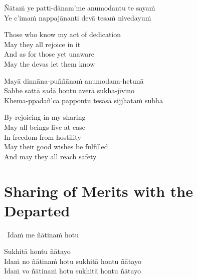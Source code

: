 Ñātaṁ ye patti-dānam'me anumodantu te sayaṁ\\
Ye c'imaṁ nappajānanti devā tesaṁ nivedayuṁ

\ifbfiveversion\clearpage\fi

\begin{english-verses}
  Those who know my act of dedication\\
  May they all rejoice in it\\
  And as for those yet unaware\\
  May the devas let them know
\end{english-verses}

Mayā dinnāna-puññānaṁ anumodana-hetunā\\
Sabbe sattā sadā hontu averā sukha-jīvino\\
Khema-ppadañ'ca pappontu tesāsā sijjhataṁ subhā

\begin{english-verses}
  By rejoicing in my sharing\\
  May all beings live at ease\\
  In freedom from hostility\\
  May their good wishes be fulfilled\\
  And may they all reach safety
\end{english-verses}

\suttaRef{[Thai]}

\ifdigitalversion{}\fi



\section{Sharing of Merits with the Departed}
\label{sharing-merits-departed}

\begin{leader-only}
  \anglebracketleft\ \hspace{-0.5mm}Idaṁ me ñātinaṁ hotu \hspace{-0.5mm}\anglebracketright\
\end{leader-only}

\vspace{-0.99em}

\begin{pali-hang}
  Sukhitā hontu ñātayo\\
  Idaṁ no ñātinaṁ hotu sukhitā hontu ñātayo\\
  Idaṁ vo ñātinaṁ hotu sukhitā hontu ñātayo
\end{pali-hang}

